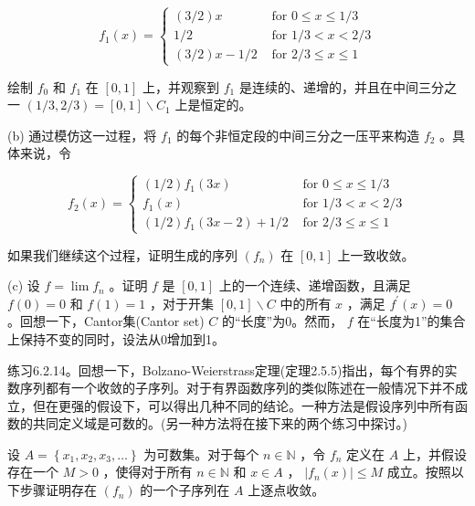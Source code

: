 \[
{f}_{1}\left( x\right)  = \left\{  \begin{array}{ll} \left( {3/2}\right) x & \text{ for }0 \leq  x \leq  1/3 \\  1/2 & \text{ for }1/3 < x < 2/3 \\  \left( {3/2}\right) x - 1/2 & \text{ for }2/3 \leq  x \leq  1 \end{array}\right.
\]

绘制 \({f}_{0}\) 和 \({f}_{1}\) 在 \(\left\lbrack  {0,1}\right\rbrack\) 上，并观察到 \({f}_{1}\) 是连续的、递增的，并且在中间三分之一 \(\left( {1/3,2/3}\right)  = \left\lbrack  {0,1}\right\rbrack   \smallsetminus  {C}_{1}\) 上是恒定的。

(b) 通过模仿这一过程，将 \({f}_{1}\) 的每个非恒定段的中间三分之一压平来构造 \({f}_{2}\) 。具体来说，令

\[
{f}_{2}\left( x\right)  = \left\{  \begin{array}{ll} \left( {1/2}\right) {f}_{1}\left( {3x}\right) & \text{ for }0 \leq  x \leq  1/3 \\  {f}_{1}\left( x\right) & \text{ for }1/3 < x < 2/3 \\  \left( {1/2}\right) {f}_{1}\left( {{3x} - 2}\right)  + 1/2 & \text{ for }2/3 \leq  x \leq  1 \end{array}\right.
\]

如果我们继续这个过程，证明生成的序列 \(\left( {f}_{n}\right)\) 在 \(\left\lbrack  {0,1}\right\rbrack\) 上一致收敛。

(c) 设 \(f = \lim {f}_{n}\) 。证明 \(f\) 是 \(\left\lbrack  {0,1}\right\rbrack\) 上的一个连续、递增函数，且满足 \(f\left( 0\right)  = 0\) 和 \(f\left( 1\right)  = 1\) ，对于开集 \(\left\lbrack  {0,1}\right\rbrack   \smallsetminus  C\) 中的所有 \(x\) ，满足 \({f}^{\prime }\left( x\right)  = 0\) 。回想一下，Cantor集(Cantor set) \(C\) 的“长度”为0。然而， \(f\) 在“长度为1”的集合上保持不变的同时，设法从0增加到1。

练习6.2.14。回想一下，Bolzano-Weierstrass定理(定理2.5.5)指出，每个有界的实数序列都有一个收敛的子序列。对于有界函数序列的类似陈述在一般情况下并不成立，但在更强的假设下，可以得出几种不同的结论。一种方法是假设序列中所有函数的共同定义域是可数的。(另一种方法将在接下来的两个练习中探讨。)

设 \(A = \left\{  {{x}_{1},{x}_{2},{x}_{3},\ldots }\right\}\) 为可数集。对于每个 \(n \in  \mathbb{N}\) ，令 \({f}_{n}\) 定义在 \(A\) 上，并假设存在一个 \(M > 0\) ，使得对于所有 \(n \in  \mathbb{N}\) 和 \(x \in  A\) ， \(\left| {{f}_{n}\left( x\right) }\right|  \leq  M\) 成立。按照以下步骤证明存在 \(\left( {f}_{n}\right)\) 的一个子序列在 \(A\) 上逐点收敛。

